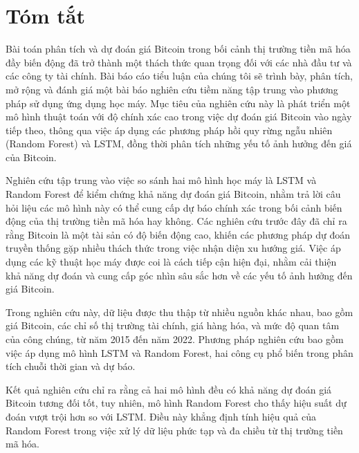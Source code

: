 




\chapter*{Tóm tắt}

\cite{chen2023analysis}Bài toán phân tích và dự đoán giá Bitcoin trong bối cảnh thị trường tiền mã hóa đầy biến động đã trở thành một thách thức quan trọng đối với các nhà đầu tư và các công ty tài chính. Bài báo cáo tiểu luận của chúng tôi sẽ trình bày, phân tích, mở rộng và đánh giá một bài báo nghiên cứu tiềm năng tập trung vào phương pháp sử dụng ứng dụng học máy. Mục tiêu của nghiên cứu này là phát triển một mô hình thuật toán với độ chính xác cao trong việc dự đoán giá Bitcoin vào ngày tiếp theo, thông qua việc áp dụng các phương pháp hồi quy rừng ngẫu nhiên (Random Forest) và LSTM, đồng thời phân tích những yếu tố ảnh hưởng đến giá của Bitcoin.

Nghiên cứu tập trung vào việc so sánh hai mô hình học máy là LSTM và Random Forest để kiểm chứng khả năng dự đoán giá Bitcoin, nhằm trả lời câu hỏi liệu các mô hình này có thể cung cấp dự báo chính xác trong bối cảnh biến động của thị trường tiền mã hóa hay không. Các nghiên cứu trước đây đã chỉ ra rằng Bitcoin là một tài sản có độ biến động cao, khiến các phương pháp dự đoán truyền thống gặp nhiều thách thức trong việc nhận diện xu hướng giá. Việc áp dụng các kỹ thuật học máy được coi là cách tiếp cận hiện đại, nhằm cải thiện khả năng dự đoán và cung cấp góc nhìn sâu sắc hơn về các yếu tố ảnh hưởng đến giá Bitcoin.

Trong nghiên cứu này, dữ liệu được thu thập từ nhiều nguồn khác nhau, bao gồm giá Bitcoin, các chỉ số thị trường tài chính, giá hàng hóa, và mức độ quan tâm của công chúng, từ năm 2015 đến năm 2022. Phương pháp nghiên cứu bao gồm việc áp dụng mô hình LSTM và Random Forest, hai công cụ phổ biến trong phân tích chuỗi thời gian và dự báo.

Kết quả nghiên cứu chỉ ra rằng cả hai mô hình đều có khả năng dự đoán giá Bitcoin tương đối tốt, tuy nhiên, mô hình Random Forest cho thấy hiệu suất dự đoán vượt trội hơn so với LSTM. Điều này khẳng định tính hiệu quả của Random Forest trong việc xử lý dữ liệu phức tạp và đa chiều từ thị trường tiền mã hóa.